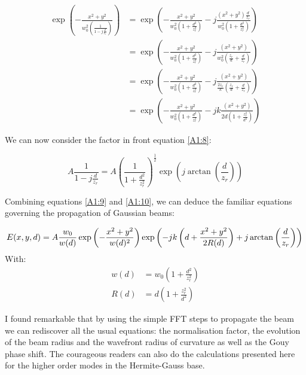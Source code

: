\begin{equation}
\begin{split}
\exp\left(- \frac{x^2 +  y^2}{w_0^2 \left(\frac{1}{1 - j \frac{d}{z_r}} \right) } \right) & = \exp \left(-\frac{x^2+y^2}{w_0^2\left(1 + \frac{d^2}{z_r^2}\right)}  -j \frac{(x^2+y^2)\frac{d}{z_r}}{w_0^2\left(1 + \frac{d^2}{z_r^2}\right)} \right)  \\
& = \exp \left(-\frac{x^2+y^2}{w_0^2\left(1 + \frac{d^2}{z_r^2}\right)} -j \frac{(x^2+y^2)}{w_0^2\left(\frac{z_r}{d} + \frac{d}{z_r}\right)}              \right)  \\
& = \exp \left(-\frac{x^2+y^2}{w_0^2\left(1 + \frac{d^2}{z_r^2}\right)} -j \frac{(x^2+y^2)}{\frac{2 z_r}{k}\left(\frac{z_r}{d} + \frac{d}{z_r}\right)}              \right)  \\
& = \exp \left(-\frac{x^2+y^2}{w_0^2\left(1 + \frac{d^2}{z_r^2}\right)} -j k\frac{(x^2+y^2)}{2 d\left(1 + \frac{z_r^2}{d^2}\right)}              \right)
\end{split}
\label{A1:9}
\end{equation}

We can now consider the factor in front equation \ref{A1:8}:

\begin{equation}
A \frac{1}{1 - j \frac{d}{z_r}} = A \left(\frac{1}{1 + \frac{d^2}{z_r^2}}\right)^\frac{1}{2} \exp\left(j \arctan\left(\frac{d}{z_r} \right)\right)
\label{A1:10}
\end{equation}

Combining equations \ref{A1:9} and \ref{A1:10}, we can deduce the familiar equations governing the propagation of Gaussian beams:

\begin{equation}
   E(x,y,d) = A \frac{w_0}{w(d)} \exp\left(- \frac{x^2 +  y^2}{w(d)^2} \right) \exp \left(-j k\left(d + \frac{x^2+y^2}{2 R(d)}\right) + j \arctan\left(\frac{d}{z_r} \right) \right) \\
\label{A1:11}
\end{equation}
With:
\begin{equation}
\begin{split}
w(d) & = w_0 \left( 1 + \frac{d^2}{z_r^2}  \right)\\
R(d) & = d\left(1 + \frac{z_r^2}{d^2}\right)
\end{split}
\label{A1:234}
\end{equation}

I found remarkable that by using the simple FFT steps to propagate the beam we can rediscover all the usual equations: the normalisation factor, the evolution of the beam radius and the wavefront radius of curvature as well as the Gouy phase shift. The courageous readers can also do the calculations presented here for the higher order modes in the Hermite-Gauss base.
